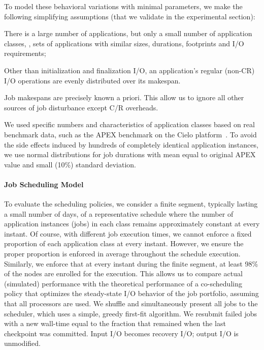 To model these behavioral variations with minimal parameters, we make the following
simplifying assumptions (that we validate in the experimental section):
\begin{compactitem}
\item There is a large number of applications, but only a small number of application
  classes, \ie, sets of applications with similar sizes, durations, footprints and
  I/O requirements;
\item Other than initialization and finalization I/O, an application's regular
  (non-CR) I/O operations are evenly distributed over its makespan.
\item Job makespans are precisely known a priori. This allow us to ignore all other
  sources of job disturbance except C/R overheads.
\end{compactitem}
We used specific numbers and characteristics of application classes based on real
benchmark data, such as the APEX benchmark on the Cielo platform~\cite{apex2016}.  To
avoid the side effects induced by hundreds of completely identical application
instances, we use normal distributions for job durations with mean equal to original
APEX value and small (10\%) standard deviation.

\paragraph{Job Scheduling Model}
To evaluate the scheduling policies, we consider a finite segment, typically lasting
a small number of days, of a representative schedule where the number of application
instances (jobs) in each class remains approximately constant at every instant. Of
course, with different job execution times, we cannot enforce a fixed proportion of
each application class at every instant. However, we ensure the proper proportion is
enforced in average throughout the schedule execution. Similarly, we enforce that at
every instant during the finite segment, at least 98\% of the nodes are enrolled for
the execution. This allows us to compare actual (simulated) performance with the
theoretical performance of a co-scheduling policy that optimizes the steady-state I/O
behavior of the job portfolio, assuming that all processors are used. We shuffle and
simultaneously present all jobs to the scheduler, which uses a simple, greedy
first-fit algorithm.  We resubmit failed jobs with a new wall-time equal to the
fraction that remained when the last checkpoint was committed. Input I/O becomes
recovery I/O; output I/O is unmodified.

